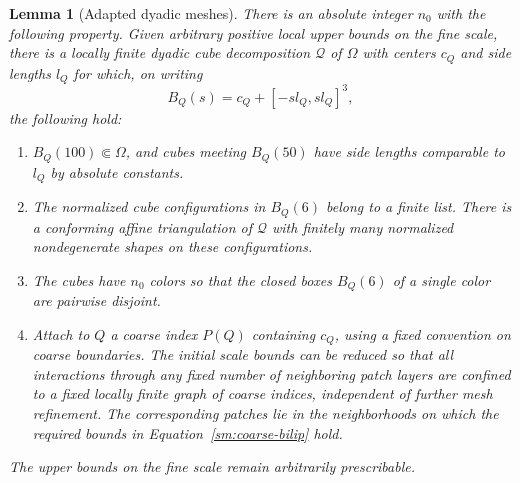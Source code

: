 \documentclass[11pt]{article}
\numberwithin{equation}{section}
\newtheorem{lemma}[theorem]{Lemma}
\theoremstyle{definition}
\theoremstyle{remark}
\begin{document}
\begin{lemma}[Adapted dyadic meshes]
\label{sm:mesh}
There is an absolute integer $n_0$ with the following property.
Given arbitrary positive local upper bounds on the fine scale, there
is a locally finite dyadic cube decomposition $\mathcal Q$ of $\Omega$
with centers $c_Q$ and side lengths $l_Q$ for which, on writing
\begin{equation}
 \label{sm:patch-box}
 B_Q(s)=c_Q+[-s l_Q,s l_Q]^3,
\end{equation}
the following hold:
\begin{enumerate}[label=\textup{(\roman*)}]
 \item $B_Q(100)\Subset\Omega$, and cubes meeting $B_Q(50)$ have
 side lengths comparable to $l_Q$ by absolute constants.
 \item The normalized cube configurations in $B_Q(6)$ belong to a
 finite list.  There is a conforming affine triangulation of
 $\mathcal Q$ with finitely many normalized nondegenerate shapes
 on these configurations.
 \item The cubes have $n_0$ colors so that the closed boxes $B_Q(6)$
 of a single color are pairwise disjoint.
 \item Attach to $Q$ a coarse index $P(Q)$ containing $c_Q$, using
 a fixed convention on coarse boundaries.  The initial scale
 bounds can be reduced so that all interactions through any fixed
 number of neighboring patch layers are confined to a fixed
 locally finite graph of coarse indices, independent of further
 mesh refinement.  The corresponding patches lie in the
 neighborhoods on which the required bounds in
 Equation~\eqref{sm:coarse-bilip} hold.
\end{enumerate}
The upper bounds on the fine scale remain arbitrarily prescribable.
\end{lemma}
\end{document}
